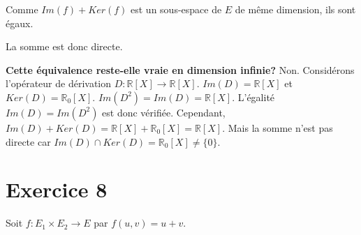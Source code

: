 \documentclass[french]{yLectureNote}
\begin{document}
\begin{itemize}
    Comme $Im(f)+Ker(f)$ est un sous-espace de $E$ de même dimension, ils sont égaux.

    La somme est donc directe.

    \textbf{Cette équivalence reste-elle vraie en dimension infinie?}
    Non. Considérons l'opérateur de dérivation $D:\mathbb{R}[X]\to\mathbb{R}[X]$.
    $Im(D)=\mathbb{R}[X]$ et $Ker(D)=\mathbb{R}_0[X]$.
    $Im(D^2)=Im(D)=\mathbb{R}[X]$. L'égalité $Im(D)=Im(D^2)$ est donc vérifiée.
    Cependant, $Im(D)+Ker(D) = \mathbb{R}[X]+\mathbb{R}_0[X] = \mathbb{R}[X]$. Mais la somme n'est pas directe car $Im(D)\cap Ker(D)=\mathbb{R}_0[X] \neq \{0\}$.
\end{itemize}

\section*{Exercice 8}

Soit $f:E_{1}\times E_{2}\rightarrow E$ par $f(u,v)=u+v$.
\end{document}
